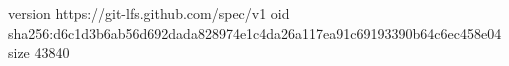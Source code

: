 version https://git-lfs.github.com/spec/v1
oid sha256:d6c1d3b6ab56d692dada828974e1c4da26a117ea91c69193390b64c6ec458e04
size 43840
